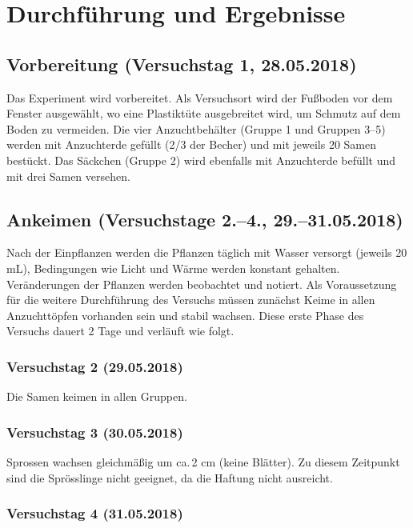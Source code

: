 \documentclass[
11pt, 
ngerman,
listof=totocnumbered,
oneside,
bibliography=totocnumbered,
abstracton
]{scrreprt}
\begin{document}
\section{Durchführung und Ergebnisse}

\subsection{Vorbereitung (Versuchstag 1, 28.05.2018)}

Das Experiment wird vorbereitet. Als Versuchsort wird der Fußboden vor dem Fenster ausgewählt, wo eine Plastiktüte ausgebreitet wird, um Schmutz auf dem Boden zu vermeiden. Die vier Anzuchtbehälter (Gruppe 1 und Gruppen 3--5) werden mit Anzuchterde gefüllt (2/3 der Becher) und mit jeweils 20 Samen bestückt. Das Säckchen (Gruppe 2) wird ebenfalls mit Anzuchterde befüllt und mit drei Samen versehen. 

\subsection{Ankeimen (Versuchstage 2.--4., 29.--31.05.2018)}

Nach der Einpflanzen werden die Pflanzen täglich mit Wasser versorgt (jeweils 20 mL), Bedingungen wie Licht und Wärme werden konstant gehalten. Veränderungen der Pflanzen werden beobachtet und notiert. Als Voraussetzung für die weitere Durchführung des Versuchs müssen zunächst Keime in allen Anzuchttöpfen vorhanden sein und stabil wachsen. Diese erste Phase des Versuchs dauert 2 Tage und verläuft wie folgt. 

\subsubsection{Versuchstag 2 (29.05.2018)} 

Die Samen keimen in allen Gruppen. 

\subsubsection{Versuchstag 3 (30.05.2018)} 

Sprossen wachsen gleichmäßig um ca.\,2 cm (keine Blätter). Zu diesem Zeitpunkt sind die Sprösslinge nicht geeignet, da die Haftung nicht ausreicht. 

\subsubsection{Versuchstag 4 (31.05.2018)} 
\end{document}
